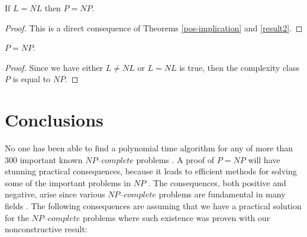 \documentclass[a4paper,UKenglish,cleveref, autoref]{lipics-v2019}
\begin{document}
\begin{theorem}
If $L = NL$ then $P = NP$.
\end{theorem}

\begin{proof}
This is a direct consequence of Theorems \ref{pos-implication} and \ref{result2}.
\end{proof}

\begin{theorem}
$P = NP$.
\end{theorem}

\begin{proof}
Since we have either $L \neq NL$ or $L = NL$ is true, then the complexity class $P$ is equal to $NP$.
\end{proof}


\section{Conclusions}

No one has been able to find a polynomial time algorithm for any of more than $300$ important known $\textit{NP--complete}$ problems \cite{GJ79}. A proof of $P = NP$ will have stunning practical consequences, because it leads to efficient methods for solving some of the important problems in $NP$ \cite{CS00}. The consequences, both positive and negative, arise since various $\textit{NP--complete}$ problems are fundamental in many fields \cite{CS00}. The following consequences are assuming that we have a practical solution for the $\textit{NP--complete}$ problems where such existence was proven with our nonconstructive result:
\end{document}
